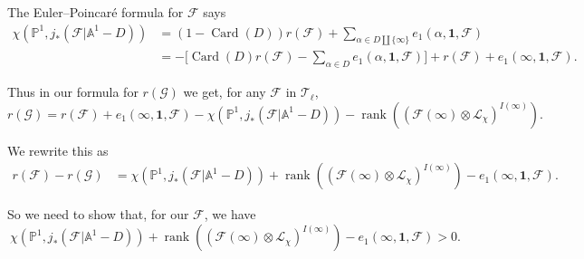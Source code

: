 The Euler--Poincaré formula for \(\mathcal{F}\) says
\[
\begin{aligned}
  \chi(\mathbb{P}^1,j_*(\mathcal{F}\vert\mathbb{A}^1-D))
  &=
  (1-\operatorname{Card}(D))r(\mathcal{F})
  +
  \sum_{\alpha\in D\amalg\{\infty\}}e_1(\alpha,\mathbf{1},\mathcal{F})\\
  &=
  -\bigl[\operatorname{Card}(D)r(\mathcal{F})
  -\sum_{\alpha\in D}e_1(\alpha,\mathbf{1},\mathcal{F})\bigr]
  +r(\mathcal{F})+e_1(\infty,\mathbf{1},\mathcal{F}).
\end{aligned}
\]

Thus in our formula for \(r(\mathcal{G})\) we get, for any \(\mathcal{F}\) in
\(\mathcal{T}_\ell\),
\[
  r(\mathcal{G})=
  r(\mathcal{F})+e_1(\infty,\mathbf{1},\mathcal{F})
  -\chi(\mathbb{P}^1,j_*(\mathcal{F}\vert\mathbb{A}^1-D))
  -
  \operatorname{rank}((\mathcal{F}(\infty)\otimes\mathcal{L}_\chi)^{I(\infty)}).
\]

We rewrite this as
\[
\begin{aligned}
  r(\mathcal{F})-r(\mathcal{G})
  &=
  \chi(\mathbb{P}^1,j_*(\mathcal{F}\vert\mathbb{A}^1-D))
  +
  \operatorname{rank}((\mathcal{F}(\infty)\otimes\mathcal{L}_\chi)^{I(\infty)})
  -
  e_1(\infty,\mathbf{1},\mathcal{F}).
\end{aligned}
\]

So we need to show that, for our \(\mathcal{F}\), we have
\[
  \chi(\mathbb{P}^1,j_*(\mathcal{F}\vert\mathbb{A}^1-D))
  +
  \operatorname{rank}((\mathcal{F}(\infty)\otimes\mathcal{L}_\chi)^{I(\infty)})
  -
  e_1(\infty,\mathbf{1},\mathcal{F})>0.
\]

